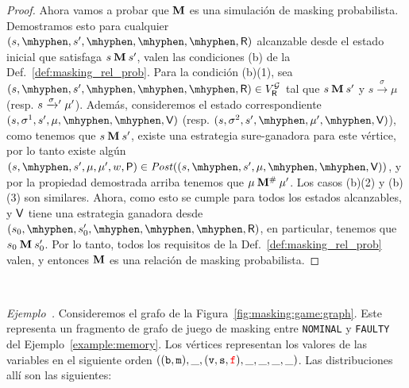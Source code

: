 \begin{proof}
Ahora vamos a probar que $\mathbin{\mathbf{M}}$ es una simulación de masking probabilista. Demostramos esto para cualquier $(s,\mhyphen,s',\mhyphen, \mhyphen,  \mhyphen, \Refuter)$ alcanzable desde el estado inicial que satisfaga $s \mathbin{\mathbf{M}} s'$, valen las condiciones (b) de la Def.~\ref{def:masking_rel_prob}.  Para la condición (b)(1), sea $(s,\mhyphen,s',\mhyphen, \mhyphen,  \mhyphen, \Refuter) \in V^{\StochG}_\Refuter$ tal que 
$s \mathbin{\mathbf{M}} s'$ y $s \xrightarrow{\sigma} \mu$ (resp. $s \mathrel{{\xrightarrow[]{\sigma}}{}'} \mu'$). Además, consideremos el estado correspondiente 
$(s,\sigma^1,s', \mu, \mhyphen, \mhyphen, \Verifier)$ (resp.  $(s,\sigma^2,s',  \mhyphen, \mu', \mhyphen, \Verifier)$),  como tenemos que $s \mathbin{\mathbf{M}} s'$, existe una estrategia sure-ganadora para este vértice, por lo tanto existe algún 
$(s,\mhyphen,s', \mu,  \mu', w,\Probabilistic) \in \post((s,\mhyphen,s', \mu, \mhyphen, \mhyphen, \Verifier))$, y por la propiedad demostrada arriba tenemos que 
$\mu \mathbin{\mathbf{M^{\#}}} \mu'$. Los casos (b)(2) y (b)(3) son similares.  Ahora, como esto se cumple para todos los estados alcanzables, y 
$\mathsf{V}$ tiene una estrategia ganadora desde $(s_0, \mhyphen, s'_0, \mhyphen, \mhyphen,  \mhyphen, \Refuter)$, en particular, tenemos que $s_0 \mathbin{\mathbf{M}} s'_0$. 
Por lo tanto, todos los requisitos de la Def.~\ref{def:masking_rel_prob} valen, y entonces $\mathbin{\mathbf{M}}$ es una relación de masking probabilista. 
\end{proof} \\



\medskip\par\noindent\textit{Ejemplo~\theexample.}
%
  Consideremos el grafo de la Figura~\ref{fig:masking:game:graph}. 
  Este representa un fragmento de grafo de juego de masking entre
  \texttt{NOMINAL} y \texttt{FAULTY} del  Ejemplo~\ref{example:memory}.
  Los vértices representan los valores de las variables en el siguiente orden
  $((\texttt{b},\texttt{m}),\_,(\texttt{v},\texttt{s},\textcolor{red}{\texttt{f}}),\_,\_,\_,\_)$.
  Las distribuciones allí son las siguientes:\vspace{-2ex}%
  
